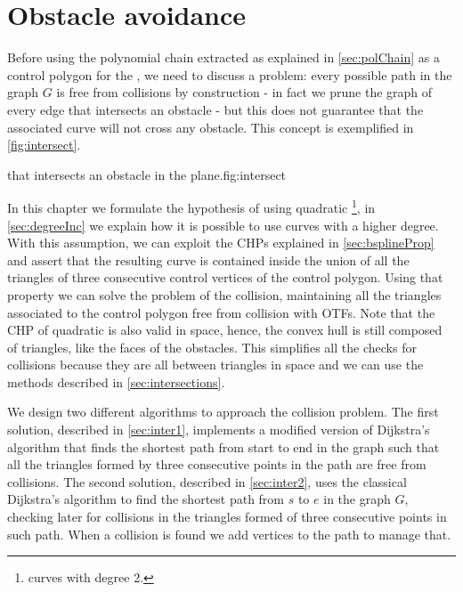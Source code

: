\documentclass[dissertation.tex]{subfiles}
\begin{document}
\section{Obstacle avoidance}\label{sec:obsAvoid}
Before using the polynomial chain extracted as
explained in \cref{sec:polChain} as a control polygon for the
\bs, we need to discuss a
problem: every possible path in the graph $G$ is
free from collisions by construction - in fact we prune the graph of
every edge that intersects an obstacle - but this does not guarantee
that the associated curve will not cross any obstacle. This concept is
exemplified in
\cref{fig:intersect}.
\begin{myfig}{\bs that intersects an obstacle in the plane.}{fig:intersect}
\end{myfig}

In this chapter we formulate the hypothesis of using
quadratic \bss\footnote{\bs curves with degree 2.}, in
\cref{sec:degreeInc} we explain how it is possible to use curves with
a higher degree. With this assumption, we can exploit the \acp{CHP}
explained in \cref{sec:bsplineProp} and assert that the 
resulting curve is contained inside the union of all the triangles of
three consecutive control vertices of the control
polygon. Using that property we can solve the problem of the
collision, maintaining all the triangles associated to the control
polygon free 
from collision with \acp{OTF}. Note that the \ac{CHP} of quadratic
\bss is also valid in space, hence, the convex hull is still composed
of triangles, like the faces of the
obstacles. This simplifies all the checks for collisions because they
are all between triangles in space and we can use the methods
described in \cref{sec:intersections}.

We design two different algorithms to approach the collision
problem. The first solution, described in \cref{sec:inter1}, implements
a modified version of Dijkstra's
algorithm that finds the shortest path from start to end in the graph
such that all the triangles formed by three consecutive points in the path
are free from collisions. The second solution, described in
\cref{sec:inter2}, uses the classical Dijkstra's algorithm to find
the shortest path from $s$ to $e$ in the graph $G$, checking later for
collisions in the triangles formed of three consecutive points in such
path. When a collision is found we add vertices to the path to manage that.
\end{document}
